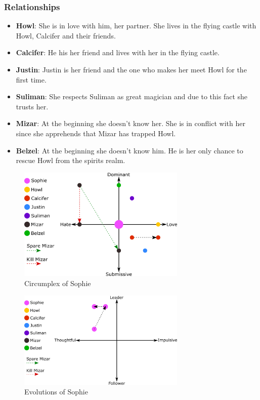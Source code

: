 \subsubsection*{Relationships}
\begin{itemize}
\item \textbf{Howl}: She is in love with him, her partner. She lives in the flying castle with Howl, Calcifer and their friends.
\item \textbf{Calcifer}: He his her friend and lives with her in the flying castle.
\item \textbf{Justin}: Justin is her friend and the one who makes her meet Howl for the first time.
\item \textbf{Suliman}: She respects Suliman as great magician and due to this fact she trusts her.
\item \textbf{Mizar}: At the beginning she doesn’t know her. She is in conflict with her since she apprehends that Mizar has trapped Howl.
\item \textbf{Belzel}: At the beginning she doesn’t know him. He is her only chance to rescue Howl from the spirits realm.
\end{itemize}

\begin{figure}[H]
  \centering
  \includegraphics[width=8cm]{Images/SVG/Exported/Circumplexes/sophieCircumplex}
  \caption{Circumplex of Sophie}
\end{figure}

\begin{figure}[H]
  \centering
  \includegraphics[width=8cm]{Images/SVG/Exported/Evolutions/sophieEvolution}
  \caption{Evolutions of Sophie}
\end{figure}

